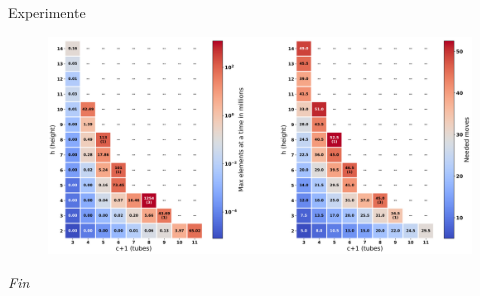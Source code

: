 \documentclass{beamer}
\begin{document}
\begin{frame}{Experimente}
\begin{figure}
    \centering
    \includegraphics[width=\textwidth]{botexp}
\end{figure}
\end{frame}

\begin{frame}{}
  \centering \Huge
  \emph{Fin}
\end{frame}


	
    	
    	
    	
\end{document}
